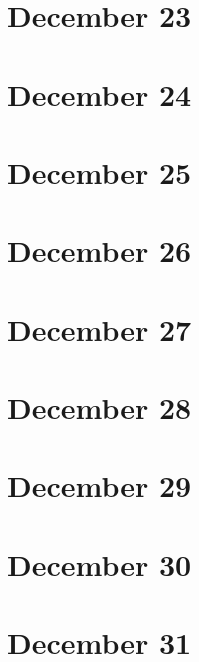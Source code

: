 \section{December 23}

\section{December 24}

\section{December 25}

\section{December 26}

\section{December 27}

\section{December 28}

\section{December 29}

\section{December 30}

\section{December 31}

